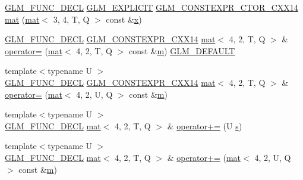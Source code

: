 \begin{DoxyCompactItemize}
\item 
\hyperlink{setup_8hpp_ab2d052de21a70539923e9bcbf6e83a51}{G\+L\+M\+\_\+\+F\+U\+N\+C\+\_\+\+D\+E\+CL} \hyperlink{setup_8hpp_a6c74f5a5e7b134ab69023ff9a30d4d5d}{G\+L\+M\+\_\+\+E\+X\+P\+L\+I\+C\+IT} \hyperlink{setup_8hpp_a0900f9145e68bf6061b6f5e7be3fa751}{G\+L\+M\+\_\+\+C\+O\+N\+S\+T\+E\+X\+P\+R\+\_\+\+C\+T\+O\+R\+\_\+\+C\+X\+X14} \hyperlink{structglm_1_1mat_3_014_00_012_00_01_t_00_01_q_01_4_a856e9ec2cb9eccab34f2391e85da5d43}{mat} (\hyperlink{structglm_1_1mat}{mat}$<$ 3, 4, T, Q $>$ const \&\hyperlink{_s_d_l__opengl_8h_ad0e63d0edcdbd3d79554076bf309fd47}{x})
\item 
\hyperlink{setup_8hpp_ab2d052de21a70539923e9bcbf6e83a51}{G\+L\+M\+\_\+\+F\+U\+N\+C\+\_\+\+D\+E\+CL} \hyperlink{setup_8hpp_a4dd12abf5e1164bc57f3a34671d03844}{G\+L\+M\+\_\+\+C\+O\+N\+S\+T\+E\+X\+P\+R\+\_\+\+C\+X\+X14} \hyperlink{structglm_1_1mat}{mat}$<$ 4, 2, T, Q $>$ \& \hyperlink{structglm_1_1mat_3_014_00_012_00_01_t_00_01_q_01_4_a6a56d1dba730527a30adb44baf03d44d}{operator=} (\hyperlink{structglm_1_1mat}{mat}$<$ 4, 2, T, Q $>$ const \&\hyperlink{_s_d_l__opengl__glext_8h_af593500c283bf1a787a6f947f503a5c2}{m}) \hyperlink{setup_8hpp_aefce7051c376a64ba89fa93a9f63bc2c}{G\+L\+M\+\_\+\+D\+E\+F\+A\+U\+LT}
\item 
{\footnotesize template$<$typename U $>$ }\\\hyperlink{setup_8hpp_ab2d052de21a70539923e9bcbf6e83a51}{G\+L\+M\+\_\+\+F\+U\+N\+C\+\_\+\+D\+E\+CL} \hyperlink{setup_8hpp_a4dd12abf5e1164bc57f3a34671d03844}{G\+L\+M\+\_\+\+C\+O\+N\+S\+T\+E\+X\+P\+R\+\_\+\+C\+X\+X14} \hyperlink{structglm_1_1mat}{mat}$<$ 4, 2, T, Q $>$ \& \hyperlink{structglm_1_1mat_3_014_00_012_00_01_t_00_01_q_01_4_a40494ccea0b2ac5816c33779b9e25d74}{operator=} (\hyperlink{structglm_1_1mat}{mat}$<$ 4, 2, U, Q $>$ const \&\hyperlink{_s_d_l__opengl__glext_8h_af593500c283bf1a787a6f947f503a5c2}{m})
\item 
{\footnotesize template$<$typename U $>$ }\\\hyperlink{setup_8hpp_ab2d052de21a70539923e9bcbf6e83a51}{G\+L\+M\+\_\+\+F\+U\+N\+C\+\_\+\+D\+E\+CL} \hyperlink{structglm_1_1mat}{mat}$<$ 4, 2, T, Q $>$ \& \hyperlink{structglm_1_1mat_3_014_00_012_00_01_t_00_01_q_01_4_ada841f0d997158c603b39e19bea7686c}{operator+=} (U \hyperlink{_s_d_l__opengl_8h_a4af680a6c683f88ed67b76f207f2e6e4}{s})
\item 
{\footnotesize template$<$typename U $>$ }\\\hyperlink{setup_8hpp_ab2d052de21a70539923e9bcbf6e83a51}{G\+L\+M\+\_\+\+F\+U\+N\+C\+\_\+\+D\+E\+CL} \hyperlink{structglm_1_1mat}{mat}$<$ 4, 2, T, Q $>$ \& \hyperlink{structglm_1_1mat_3_014_00_012_00_01_t_00_01_q_01_4_a18b8087339b47fc3f24babd08b729968}{operator+=} (\hyperlink{structglm_1_1mat}{mat}$<$ 4, 2, U, Q $>$ const \&\hyperlink{_s_d_l__opengl__glext_8h_af593500c283bf1a787a6f947f503a5c2}{m})

\end{DoxyCompactItemize}
